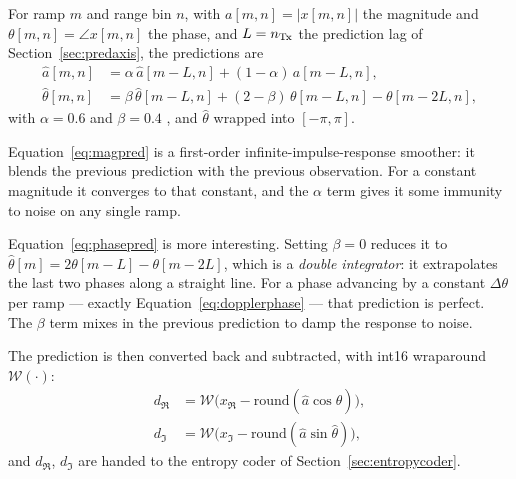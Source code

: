 For ramp $m$ and range bin $n$, with $a[m,n] = |x[m,n]|$ the magnitude and
$\theta[m,n] = \angle x[m,n]$ the phase, and $L = n_{\mathrm{Tx}}$ the prediction lag of
Section~\ref{sec:predaxis}, the predictions are
\begin{align}
\label{eq:magpred}
\hat{a}[m,n] &= \alpha\,\hat{a}[m-L,n] + (1-\alpha)\,a[m-L,n],\\[3pt]
\label{eq:phasepred}
\hat{\theta}[m,n] &= \beta\,\hat{\theta}[m-L,n]
   + (2-\beta)\,\theta[m-L,n] - \theta[m-2L,n],
\end{align}
with $\alpha = 0.6$ and $\beta = 0.4$ \cite[Table~4.4]{kiem2025}, and
$\hat{\theta}$ wrapped into $[-\pi, \pi]$.

Equation~\eqref{eq:magpred} is a first-order infinite-impulse-response
smoother: it blends the previous prediction with the previous observation. For
a constant magnitude it converges to that constant, and the $\alpha$ term gives
it some immunity to noise on any single ramp.

Equation~\eqref{eq:phasepred} is more interesting. Setting $\beta = 0$ reduces
it to $\hat{\theta}[m] = 2\theta[m-L] - \theta[m-2L]$, which is a
\emph{double integrator}: it extrapolates the last two phases along a straight
line. For a phase advancing by a constant $\Delta\theta$ per ramp --- exactly
Equation~\eqref{eq:dopplerphase} --- that prediction is perfect. The $\beta$
term mixes in the previous prediction to damp the response to noise.

The prediction is then converted back and subtracted, with int16 wraparound
$\mathcal{W}(\cdot)$:
\begin{align}
d_{\Re} &= \mathcal{W}\bigl(x_{\Re} - \mathrm{round}(\hat{a}\cos\hat{\theta})\bigr),\\
d_{\Im} &= \mathcal{W}\bigl(x_{\Im} - \mathrm{round}(\hat{a}\sin\hat{\theta})\bigr),
\end{align}
and $d_{\Re}$, $d_{\Im}$ are handed to the entropy coder of
Section~\ref{sec:entropycoder}.

